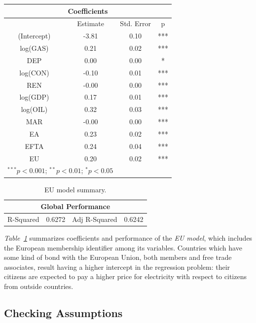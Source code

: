 \documentclass[a4paper,12pt]{book}
\begin{document}
\begin{table}[tb]
\begin{center}
\begin{tabular}{|c|c|c|c|}
\hline
\multicolumn{4}{|c|}{Coefficients}\\
\hline
&Estimate&Std. Error&p\\
\hline
(Intercept)&-3.81&0.10&***\\
log(GAS)&0.21&0.02&***\\
DEP&0.00&0.00&*\\
log(CON)&-0.10&0.01&***\\
REN&-0.00&0.00&***\\
log(GDP)&0.17&0.01&***\\
log(OIL)&0.32&0.03&***\\
MAR&-0.00&0.00&***\\
EA&0.23&0.02&***\\
EFTA&0.24&0.04&***\\
EU&0.20&0.02&***\\
\hline
\multicolumn{2}{l}{\scriptsize{$^{***}p<0.001$; $^{**}p<0.01$; $^{*}p<0.05$}}
\end{tabular}
\end{center}
\end{table}
\begin{table}[tb]
\begin{center}
\begin{tabular}{|c|c|c|c|}
\hline
\multicolumn{4}{|c|}{Global Performance}\\
\hline
R-Squared&0.6272&Adj R-Squared&0.6242\\
\hline
\end{tabular}
\caption{EU model summary.}
\label{Tab:m3}
\end{center}
\end{table}

\textit{Table~\ref{Tab:m3}} summarizes coefficients and performance of the \textit{EU model}, which includes the European membership identifier among its variables. Countries which have some kind of bond with the European Union, both members and free trade associates, result having a higher intercept in the regression problem: their citizens are expected to pay a higher price for electricity with respect to citizens from outside countries.

\subsection{Checking Assumptions}
\end{document}
